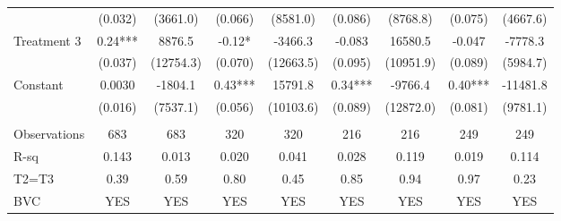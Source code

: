 \begin{tabular}{lcccccccc}
      & (0.032) & (3661.0) & (0.066) & (8581.0) & (0.086) & (8768.8) & (0.075) & (4667.6) \\
Treatment 3 & 0.24*** & 8876.5 & -0.12* & -3466.3 & -0.083 & 16580.5 & -0.047 & -7778.3 \\
      & (0.037) & (12754.3) & (0.070) & (12663.5) & (0.095) & (10951.9) & (0.089) & (5984.7) \\
Constant  & 0.0030 & -1804.1 & 0.43*** & 15791.8 & 0.34*** & -9766.4 & 0.40*** & -11481.8 \\
      & (0.016) & (7537.1) & (0.056) & (10103.6) & (0.089) & (12872.0) & (0.081) & (9781.1) \\
      &       &       &       &       &       &       &       &  \\
Observations & 683   & 683   & 320   & 320   & 216   & 216   & 249   & 249 \\
R-sq  & 0.143 & 0.013 & 0.020 & 0.041 & 0.028 & 0.119 & 0.019 & 0.114 \\
T2=T3 & 0.39  & 0.59  & 0.80  & 0.45  & 0.85  & 0.94  & 0.97  & 0.23 \\
BVC   & YES   & YES   & YES   & YES   & YES   & YES   & YES   & YES \\
\bottomrule
\bottomrule
\end{tabular}%

